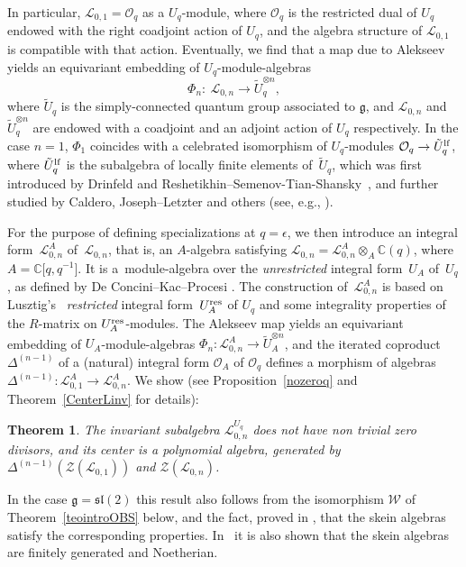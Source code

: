 \documentclass[pdftex]{sigma}%
\numberwithin{equation}{section}
\numberwithin{figure}{section}
\newtheorem{teo}{Theorem}[section]
\newcommand{\e}{\epsilon}
\newcommand{\mc}{\mathbb{C}}
\newcommand{\Ll}{{\mathcal L}}
\newcommand{\ra}{\rightarrow}
\begin{document}
In particular, $\Ll_{0,1} = \mathcal{O}_q$ as a $U_q$-module, where $\mathcal{O}_q$ is the restricted dual of $U_q$ endowed with the right coadjoint action of $U_q$, and the algebra structure of $\Ll_{0,1}$ is compatible with that action. Eventually, we find that a map due to Alekseev \cite{A} yields an equivariant embedding of $U_q$-module-algebras
\[\Phi_n\colon \ \Ll_{0,n}\ra \tilde U_q^{\otimes n}, \]
where $\tilde U_q$ is the simply-connected quantum group associated to $\mathfrak{g}$, and $\Ll_{0,n}$ and $\tilde U_q^{\otimes n}$ are endowed with a coadjoint and an adjoint action of $U_q$ respectively. In the case $n=1$, $\Phi_1$ coincides with a celebrated isomorphism of $U_q$-modules $\mathcal{O}_q \ra \tilde U_q^{\rm lf}$, where $\tilde U_q^{\rm lf}$ is the subalgebra of locally finite elements of~$\tilde U_q$, which was first introduced by Drinfeld and Reshetikhin--Semenov-Tian-Shansky~\cite{RSTS}, and further studied by Caldero, Joseph--Letzter and others (see, e.g., \cite{Bau1, Ca,JL2}).

For the purpose of defining specializations at $q=\e$, we then introduce an integral form~$\Ll_{0,n}^A$ of~$\Ll_{0,n}$, that is, an $A$-algebra satisfying $\Ll_{0,n} = \Ll_{0,n}^A\otimes_A \mc(q)$, where $A=\mc\big[q,q^{-1}\big]$. It is a~module-algebra over the {\it unrestricted} integral form~$U_A$ of~$U_q$, as defined by De Concini--Kac--Procesi \cite{DC-K,DC-K-P2}. The construction of~$\Ll_{0,n}^A$ is based on Lusztig's~\cite{Lusztig} {\it restricted} integral form~$U_A^{\rm res}$ of $U_q$ and some integrality properties of the $R$-matrix on $U_A^{\rm res}$-modules. The Alekseev map yields an equivariant embedding of $U_A$-module-algebras $\Phi_n\colon \Ll_{0,n}^A\ra \tilde U_A^{\otimes n}$, and the iterated coproduct~$\Delta^{(n-1)}$ of a (natural) integral form $\mathcal{O}_A$ of $\mathcal{O}_q$ defines a morphism of algebras $\Delta^{(n-1)}\colon \Ll_{0,1}^A\rightarrow \Ll_{0,n}^A$. We show (see Proposition~\ref{nozeroq} and Theorem~\ref{CenterLinv} for details):
\begin{teo}\label{teointrogen} The invariant subalgebra $\Ll_{0,n}^{U_q}$ does not have non trivial zero divisors, and its center is a polynomial algebra, generated by $\Delta^{(n-1)}(\mathcal{Z}(\Ll_{0,1}))$ and $\mathcal{Z}(\Ll_{0,n})$.
\end{teo}

In the case $\mathfrak{g} = {\mathfrak{sl}}(2)$ this result also follows from the isomorphism $\mathcal{W}$ of Theorem~\ref{teointroOBS} below, and the fact, proved in \cite{BW0,PS}, that the skein algebras satisfy the corresponding properties. In~\cite{PS} it is also shown that the skein algebras are finitely generated and Noetherian.
\end{document}
